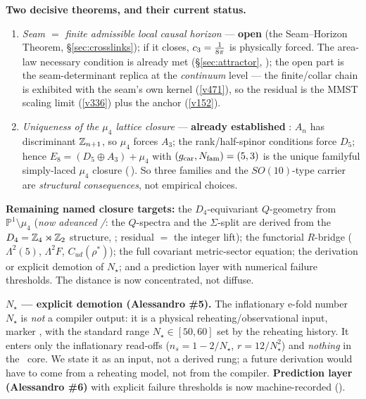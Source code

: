 \noindent\textbf{Two decisive theorems, and their current status.}
\begin{enumerate}[leftmargin=1.7em,itemsep=2pt]
\item \emph{Seam $=$ finite admissible local causal horizon} --- \textbf{open \mO} (the Seam--Horizon
Theorem, \S\ref{sec:crosslinks}); if it closes, $c_3=\tfrac1{8\pi}$ is physically forced. The area-law
necessary condition is already met (\S\ref{sec:attractor}, ); the open
part is the seam-determinant replica at the \emph{continuum} level --- the finite/collar chain is
exhibited with the seam's own kernel (\vref{v471}), so the residual is the MMST scaling limit
(\vref{v336}) plus the anchor (\vref{v152}).
\item \emph{Uniqueness of the $\mu_4$ lattice closure} --- \textbf{already established \mE}: $A_n$ has
discriminant $\mathbb Z_{n+1}$, so $\mu_4$ forces $A_3$; the rank/half-spinor conditions force $D_5$; hence
$E_8=(D_5{\oplus}A_3)+\mu_4$ with $(g_{\mathrm{car}},N_{\mathrm{fam}})=(5,3)$ is the unique familyful simply-laced $\mu_4$ closure
(\,). So three families and the
$SO(10)$-type carrier are \emph{structural consequences}, not empirical choices.
\end{enumerate}

\noindent\textbf{Remaining named closure targets:} the $D_4$-equivariant $Q$-geometry from
$\mathbb P^1\setminus\mu_4$ (\emph{now advanced \mC/\mE}: the $Q$-spectra and the $\Sigma$-split are
derived from the $D_4=\mathbb Z_4\rtimes\mathbb Z_2$ structure, ; residual $=$ the integer
lift); the functorial $R$-bridge ($\Lambda^2(5)$, $\Lambda^2F$, $C_{ud}(\rho^\ast)$);
the full covariant metric-sector equation; the derivation or explicit demotion of $N_\star$; and a
prediction layer with numerical failure thresholds. The distance is now concentrated, not diffuse.

\smallskip\noindent\textbf{$N_\star$ --- explicit demotion (Alessandro \#5).} The inflationary e-fold number
$N_\star$ is \emph{not} a compiler output: it is a physical reheating/observational input, marker \mC, with
the standard range $N_\star\in[50,60]$ set by the reheating history. It enters only the inflationary
read-offs ($n_s=1-2/N_\star$, $r=12/N_\star^2$) and \emph{nothing} in the \mE\ core. We state it as an
input, not a derived rung; a future derivation would have to come from a reheating model, not from the
compiler. \textbf{Prediction layer (Alessandro \#6)} with explicit failure thresholds is now machine-recorded
().

